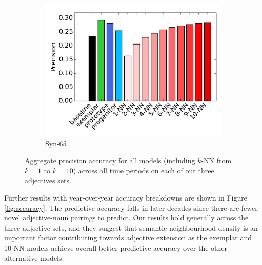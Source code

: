 \documentclass[output=paper]{langsci/langscibook}
\begin{document}
\begin{figure}
\begin{subfigure}{.32\textwidth}
  \includegraphics[width=.96\linewidth]{figures/GREWAL_aggregate_precision_syn65.png}
  \caption{\sc Syn-65}
\end{subfigure}
\caption{Aggregate precision accuracy for all models (including $k$-NN from $k = 1$ to $k = 10$) across all time periods on each of our three adjectives sets.}
\label{fig:aggregate}
\end{figure}



Further results with year-over-year accuracy breakdowns are shown in Figure \ref{fig:accuracy}.
The predictive accuracy falls in later decades since there are fewer novel adjective-noun pairings to predict. Our results hold generally across the three adjective sets, and they suggest that semantic neighbourhood density is an important factor contributing towards adjective extension as the exemplar and \mbox{10-NN} models achieve overall better predictive accuracy over the other alternative models. 
\end{document}
